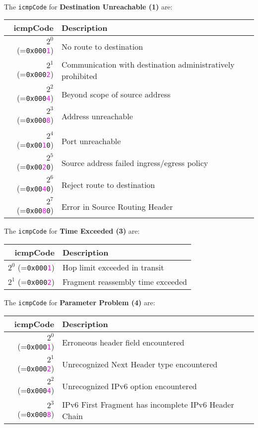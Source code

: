 \documentclass[documentation]{subfiles}
\begin{document}
\paragraph{}

The {\tt icmpCode} for {\bf Destination Unreachable (1)} are:
\begin{longtable}{rl}
    \toprule
    {\bf icmpCode} & {\bf Description}\\
    \midrule\endhead%
    $2^{0}$ (={\tt 0x000\textcolor{magenta}{1}}) & No route to destination\\
    $2^{1}$ (={\tt 0x000\textcolor{magenta}{2}}) & Communication with destination administratively prohibited\\
    $2^{2}$ (={\tt 0x000\textcolor{magenta}{4}}) & Beyond scope of source address\\
    $2^{3}$ (={\tt 0x000\textcolor{magenta}{8}}) & Address unreachable\\
    \\
    $2^{4}$ (={\tt 0x00\textcolor{magenta}{1}0}) & Port unreachable\\
    $2^{5}$ (={\tt 0x00\textcolor{magenta}{2}0}) & Source address failed ingress/egress policy\\
    $2^{6}$ (={\tt 0x00\textcolor{magenta}{4}0}) & Reject route to destination\\
    $2^{7}$ (={\tt 0x00\textcolor{magenta}{8}0}) & Error in Source Routing Header\\
    \bottomrule
\end{longtable}

The {\tt icmpCode} for {\bf Time Exceeded (3)} are:
\begin{longtable}{rl}
    \toprule
    {\bf icmpCode} & {\bf Description}\\
    \midrule\endhead%
    $2^{0}$ (={\tt 0x000\textcolor{magenta}{1}}) & Hop limit exceeded in transit\\
    $2^{1}$ (={\tt 0x000\textcolor{magenta}{2}}) & Fragment reassembly time exceeded\\
    \bottomrule
\end{longtable}

The {\tt icmpCode} for {\bf Parameter Problem (4)} are:
\begin{longtable}{rl}
    \toprule
    {\bf icmpCode} & {\bf Description}\\
    \midrule\endhead%
    $2^{0}$ (={\tt 0x000\textcolor{magenta}{1}}) & Erroneous header field encountered\\
    $2^{1}$ (={\tt 0x000\textcolor{magenta}{2}}) & Unrecognized Next Header type encountered\\
    $2^{2}$ (={\tt 0x000\textcolor{magenta}{4}}) & Unrecognized IPv6 option encountered\\
    $2^{3}$ (={\tt 0x000\textcolor{magenta}{8}}) & IPv6 First Fragment has incomplete IPv6 Header Chain\\
    \bottomrule
\end{longtable}
\end{document}
